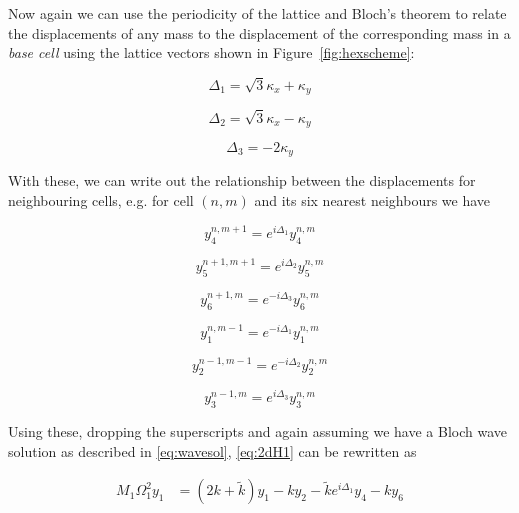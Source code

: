 Now again we can use the periodicity of the lattice and Bloch's theorem to
relate the displacements of any mass to the displacement of the corresponding
mass in a \textit{base cell} using the lattice vectors shown in
Figure~\ref{fig:hexscheme}:

\begin{equation}
  \Delta_1=\sqrt{3}\kappa_x+\kappa_y
\label{eq:hexvec1}
\end{equation}

\begin{equation}
  \Delta_2=\sqrt{3}\kappa_x-\kappa_y
\label{eq:hexvec2}
\end{equation}

\begin{equation}
  \Delta_3=-2\kappa_y
\label{eq:hexvec3}
\end{equation}

With these, we can write out the relationship between the displacements for
neighbouring cells, e.g. for cell $(n,m)$ and its six nearest neighbours we
have

\begin{equation}
  y_4^{n,m+1}=e^{i\Delta_1}y_4^{n,m}
\label{eq:hexrelate4}
\end{equation}

\begin{equation}
  y_5^{n+1,m+1}=e^{i\Delta_2}y_5^{n,m}
\label{eq:hexrelate5}
\end{equation}

\begin{equation}
  y_6^{n+1,m}=e^{-i\Delta_3}y_6^{n,m}
\label{eq:hexrelate6}
\end{equation}

\begin{equation}
  y_1^{n,m-1}=e^{-i\Delta_1}y_1^{n,m}
\label{eq:hexrelate1}
\end{equation}

\begin{equation}
  y_2^{n-1,m-1}=e^{-i\Delta_2}y_2^{n,m}
\label{eq:hexrelate2}
\end{equation}

\begin{equation}
  y_3^{n-1,m}=e^{i\Delta_3}y_3^{n,m}
\label{eq:hexrelate3}
\end{equation}

Using these, dropping the superscripts and again assuming we have a Bloch wave
solution as described in \eqref{eq:wavesol}, \eqref{eq:2dH1} can be rewritten as 

\begin{align}
M_1\Omega_1^{2}y_1
      &=\left(2k+\tilde{k}\right)y_1-ky_2-\tilde{k}e^{i\Delta_1}y_4-ky_6
\label{eq:2dH2}
\end{align}


